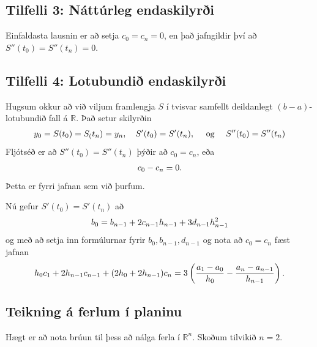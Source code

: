 \documentclass[letterpaper,10pt,icelandic]{sphinxmanual}
\begin{document}
\subsection{Tilfelli 3: Náttúrleg endaskilyrði}
\label{kafli03:tilfelli-3-natturleg-endaskilyri}
Einfaldasta lausnin er að setja \(c_0 = c_n = 0\), en það jafngildir
því að \(S''(t_0) = S''(t_n) = 0\).


\subsection{Tilfelli 4: Lotubundið endaskilyrði}
\label{kafli03:tilfelli-4-lotubundi-endaskilyri}
Hugsum okkur að við viljum framlengja \(S\) í tvisvar samfellt
deildanlegt \((b-a)\)-lotubundið fall á \({{\mathbb  R}}\). Það
setur skilyrðin
\begin{gather}
\begin{split}y_0 = S(t_0) = S_(t_n) = y_n, \quad
    S'(t_0) = S'(t_n), \quad
    \text{ og } \quad
    S''(t_0) = S''(t_n)\end{split}\notag
\end{gather}
Fljótséð er að \(S''(t_0) = S''(t_n)\) þýðir að \(c_0 = c_n\),
eða
\begin{gather}
\begin{split}c_0 - c_n = 0.\end{split}\notag
\end{gather}
Þetta er fyrri jafnan sem við þurfum.

Nú gefur \(S'(t_0) = S'(t_n)\) að
\begin{gather}
\begin{split}b_0 = b_{n-1} + 2c_{n-1}h_{n-1} + 3d_{n-1}h_{n-1}^2\end{split}\notag
\end{gather}
og með að setja inn formúlurnar fyrir \(b_0, b_{n-1}, d_{n-1}\) og
nota að \(c_0 = c_n\) fæst jafnan
\begin{gather}
\begin{split}h_0c_1 + 2h_{n-1}c_{n-1} + (2h_0 + 2h_{n-1})c_n
    = 3 \left( \frac{a_1-a_0}{h_0}
        - \frac{a_n-a_{n-1}}{h_{n-1}} \right).\end{split}\notag
\end{gather}

\subsection{Teikning á ferlum í planinu}
\label{kafli03:index-22}\label{kafli03:teikning-a-ferlum-i-planinu}
Hægt er að nota brúun til þess að nálga ferla í \(\mathbb R^n\).
Skoðum tilvikið \(n=2\).
\end{document}
